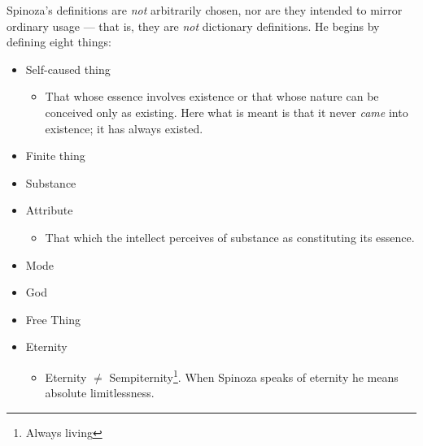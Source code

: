 \documentclass{article}
\begin{document}
\begin{spacing}{1.2}
        Spinoza's definitions are \emph{not} arbitrarily chosen, nor are they intended to mirror ordinary usage --- that is, they are \emph{not} dictionary definitions. He begins by defining eight things:
        \begin{itemize}
            \item Self-caused thing
            \begin{itemize}
                \item That whose essence involves existence or that whose nature can be conceived only as existing. Here what is meant is that it never \emph{came} into existence; it has always existed.
            \end{itemize}
            \item Finite thing
            \item Substance
            \item Attribute
            \begin{itemize}
                \item That which the intellect perceives of substance as constituting its essence. 
            \end{itemize}
            \item Mode
            \item God
            \item Free Thing
            \item Eternity
            \begin{itemize}
                \item Eternity \(\neq\) Sempiternity\footnote{Always living}. When Spinoza speaks of eternity he means absolute limitlessness.
            \end{itemize}
        \end{itemize}
        \newpage

\end{spacing}
\end{document}
